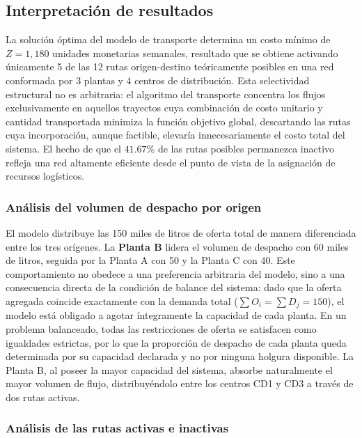 \documentclass{article}
\begin{document}
\subsection{Interpretación de resultados}

La solución óptima del modelo de transporte determina un costo mínimo de $Z = 1{,}180$ unidades monetarias semanales, resultado que se obtiene activando únicamente 5 de las 12 rutas origen-destino teóricamente posibles en una red conformada por 3 plantas y 4 centros de distribución. Esta selectividad estructural no es arbitraria: el algoritmo del transporte concentra los flujos exclusivamente en aquellos trayectos cuya combinación de costo unitario y cantidad transportada minimiza la función objetivo global, descartando las rutas cuya incorporación, aunque factible, elevaría innecesariamente el costo total del sistema. El hecho de que el $41.67\%$ de las rutas posibles permanezca inactivo refleja una red altamente eficiente desde el punto de vista de la asignación de recursos logísticos.

\subsubsection*{Análisis del volumen de despacho por origen}

El modelo distribuye las 150 miles de litros de oferta total de manera diferenciada entre los tres orígenes. La \textbf{Planta B} lidera el volumen de despacho con 60 miles de litros, seguida por la Planta A con 50 y la Planta C con 40. Este comportamiento no obedece a una preferencia arbitraria del modelo, sino a una consecuencia directa de la condición de balance del sistema: dado que la oferta agregada coincide exactamente con la demanda total ($\sum O_i = \sum D_j = 150$), el modelo está obligado a agotar íntegramente la capacidad de cada planta. En un problema balanceado, todas las restricciones de oferta se satisfacen como igualdades estrictas, por lo que la proporción de despacho de cada planta queda determinada por su capacidad declarada y no por ninguna holgura disponible. La Planta B, al poseer la mayor capacidad del sistema, absorbe naturalmente el mayor volumen de flujo, distribuyéndolo entre los centros CD1 y CD3 a través de dos rutas activas.

\subsubsection*{Análisis de las rutas activas e inactivas}
\end{document}
